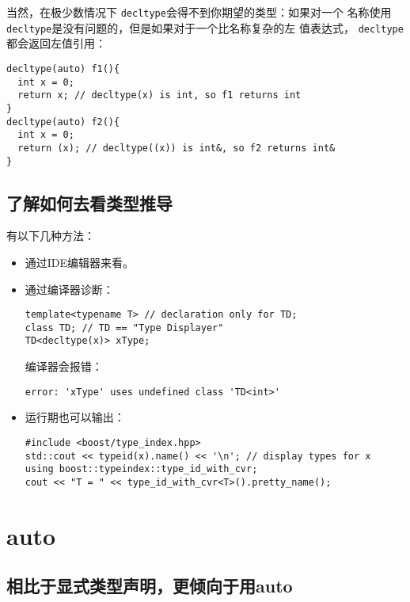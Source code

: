 \message{ !name(../CppLearning.tex)}\documentclass[a4paper,twoside]{article}
\theoremstyle{definition}
\theoremstyle{remark}
\numberwithin{equation}{section}
\let\OldTexttt\texttt
\renewcommand{\texttt}[1]{{\color{blue} \OldTexttt{#1}}}
\begin{document}
当然，在极少数情况下\texttt{decltype}会得不到你期望的类型：如果对一个
名称使用\texttt{decltype}是没有问题的，但是如果对于一个比名称复杂的左
值表达式，\texttt{decltype}都会返回左值引用：
\begin{verbatim}
decltype(auto) f1(){
  int x = 0;
  return x; // decltype(x) is int, so f1 returns int
}
decltype(auto) f2(){
  int x = 0;
  return (x); // decltype((x)) is int&, so f2 returns int&
}
\end{verbatim}

\subsection{了解如何去看类型推导}
\label{sec:Item2-4}

有以下几种方法：
\begin{itemize}
\item 通过IDE编辑器来看。
\item 通过编译器诊断：
\begin{verbatim}
template<typename T> // declaration only for TD;
class TD; // TD == "Type Displayer"
TD<decltype(x)> xType;
\end{verbatim}
  编译器会报错：
\begin{verbatim}
error: 'xType' uses undefined class 'TD<int>'
\end{verbatim}
\item 运行期也可以输出：
\begin{verbatim}
#include <boost/type_index.hpp>
std::cout << typeid(x).name() << '\n'; // display types for x
using boost::typeindex::type_id_with_cvr;
cout << "T = " << type_id_with_cvr<T>().pretty_name();
\end{verbatim}
\end{itemize}

\section{auto}

\subsection{相比于显式类型声明，更倾向于用auto}
\label{sec:Item2-5}
\end{document}
